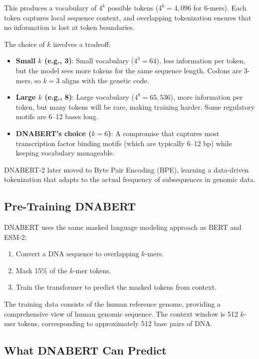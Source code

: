 This produces a vocabulary of $4^k$ possible tokens ($4^6 = 4{,}096$ for 6-mers). Each token captures local sequence context, and overlapping tokenization ensures that no information is lost at token boundaries.

\begin{implnote}
The choice of $k$ involves a tradeoff:
\begin{itemize}[leftmargin=1.5em]
  \item \textbf{Small $k$ (e.g., 3)}: Small vocabulary ($4^3 = 64$), less information per token, but the model sees more tokens for the same sequence length. Codons are 3-mers, so $k=3$ aligns with the genetic code.
  \item \textbf{Large $k$ (e.g., 8)}: Large vocabulary ($4^8 = 65{,}536$), more information per token, but many tokens will be rare, making training harder. Some regulatory motifs are 6--12 bases long.
  \item \textbf{DNABERT's choice ($k=6$)}: A compromise that captures most transcription factor binding motifs (which are typically 6--12 bp) while keeping vocabulary manageable.
\end{itemize}
DNABERT-2 later moved to Byte Pair Encoding (BPE), learning a data-driven tokenization that adapts to the actual frequency of subsequences in genomic data.
\end{implnote}

\subsection{Pre-Training DNABERT}

DNABERT uses the same masked language modeling approach as BERT and ESM-2:
\begin{enumerate}[leftmargin=1.8em]
  \item Convert a DNA sequence to overlapping $k$-mers.
  \item Mask 15\% of the $k$-mer tokens.
  \item Train the transformer to predict the masked tokens from context.
\end{enumerate}

The training data consists of the human reference genome, providing a comprehensive view of human genomic sequence. The context window is 512 $k$-mer tokens, corresponding to approximately 512 base pairs of DNA.

\subsection{What DNABERT Can Predict}

